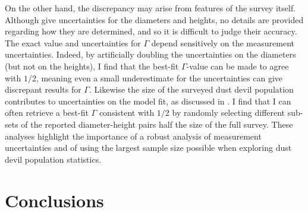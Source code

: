 \documentclass{aastex63}
\begin{document}
On the other hand, the discrepancy may arise from features of the survey itself. Although \citet{2006JGRE..11112002C} give uncertainties for the  diameters and heights, no details are provided regarding how they are determined, and so it is difficult to judge their accuracy. The exact value and uncertainties for $\Gamma$ depend sensitively on the measurement uncertainties. Indeed, by artificially doubling the uncertainties on the diameters (but not on the heights), I find that the best-fit $\Gamma$-value can be made to agree with $1/2$, meaning even a small underestimate for the uncertainties can give discrepant results for $\Gamma$. Likewise the size of the surveyed dust devil population contributes to uncertainties on the model fit, as discussed in \citet{2015JGRE..120..401J}. I find that I can often retrieve a best-fit $\Gamma$ consistent with $1/2$ by randomly selecting different sub-sets of the reported diameter-height pairs half the size of the full survey. These analyses highlight the importance of a robust analysis of measurement uncertainties and of using the largest sample size possible when exploring dust devil population statistics.

\section{Conclusions}
\label{sec:conclusions}





\end{document}
